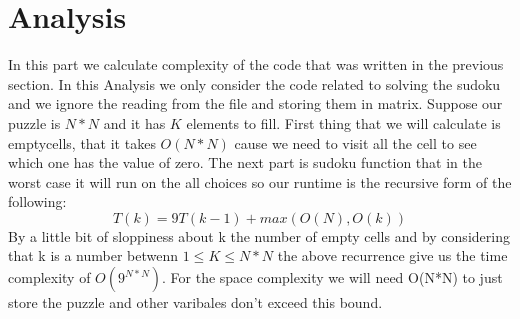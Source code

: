 \section{Analysis}
In this part we calculate complexity of the code
that was written in the previous section. In this 
Analysis we only consider the code related to solving
the sudoku and we ignore the reading from the file 
and storing them in matrix. Suppose our puzzle is $N*N$ and
it has $K$ elements to fill. First thing that we will
calculate is emptycells, that it takes $O(N*N)$ cause
we need to visit all the cell to see which one has the value
of zero. The next part is sudoku function that in the 
worst case it will run on the all choices so our runtime is
the recursive form of the following:
$$
T(k) = 9T(k-1) + max(O(N),O(k))
$$
By a little bit of sloppiness about k the number of
empty cells and by considering that k is a number betwenn $1\leq K \leq N*N$
the above recurrence give us the time complexity of
$O(9^{N*N})$.
For the space complexity we will need O(N*N) to just store
the puzzle and other varibales don't exceed this bound.